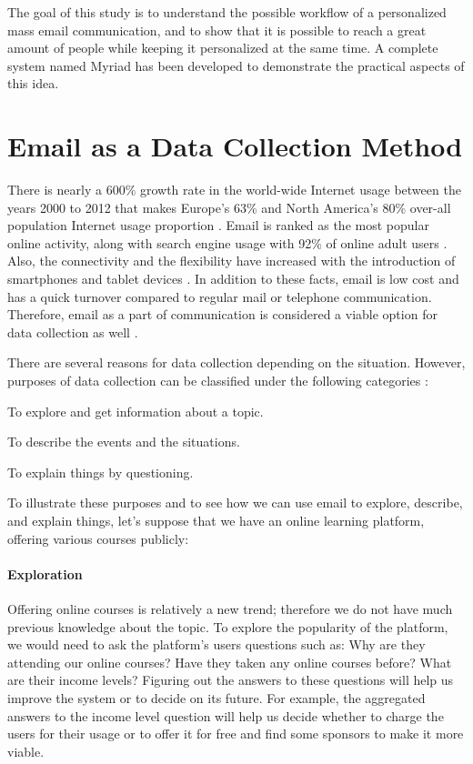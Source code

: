 The goal of this study is to understand the possible workflow of a personalized mass email communication, and to show that it is possible to reach a great amount of people while keeping it personalized at the same time. A complete system named Myriad has been developed to demonstrate the practical aspects of this idea.

\section{Email as a Data Collection Method}
\label{sec:1:EmailDataCol}

There is nearly a 600\% growth rate in the world-wide Internet usage between the years 2000 to 2012 that makes Europe's 63\% and North America's 80\% over-all population Internet usage proportion \citep{InternetWorldStats2012}. Email is ranked as the most popular online activity, along with search engine usage with 92\% of online adult users \citep{Purcell2011}. Also, the connectivity and the flexibility have increased with the introduction of smartphones and tablet devices \citep{Madden2008}. In addition to these facts, email is low cost and has a quick turnover compared to regular mail or telephone communication. Therefore, email as a part of communication is considered a viable option for data collection as well \citep{Zikmund2007}.
\vspace{1cm}

There are several reasons for data collection depending on the situation. However, purposes of data collection can be classified under the following categories \citep{Sue2011} \citep[pages 92--94]{Babbie2010}:

\begin{compactenum}
	\item To explore and get information about a topic.
	\item To describe the events and the situations.
	\item To explain things by questioning.
\end{compactenum}

To illustrate these purposes and to see how we can use email to explore, describe, and explain things, let's suppose that we have an online learning platform, offering various courses publicly:

\paragraph{Exploration}
Offering online courses is relatively a new trend; therefore we do not have much previous knowledge about the topic. To explore the popularity of the platform, we would need to ask the platform's users questions such as: Why are they attending our online courses? Have they taken any online courses before? What are their income levels? Figuring out the answers to these questions will help us improve the system or to decide on its future. For example, the aggregated answers to the income level question will help us decide whether to charge the users for their usage or to offer it for free and find some sponsors to make it more viable.

